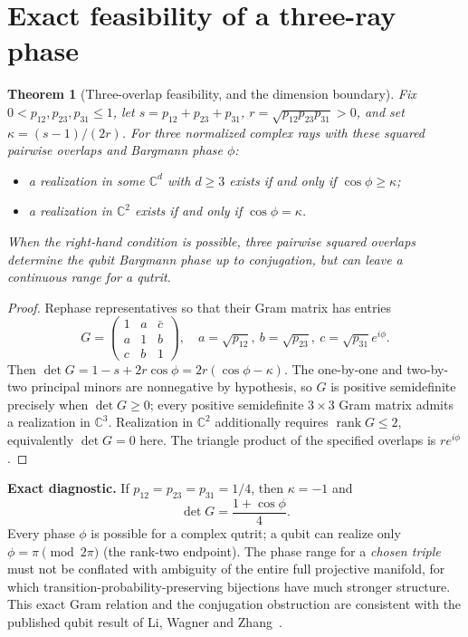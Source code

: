 \documentclass[10pt,letterpaper]{article}
\newtheorem{theorem}{Theorem}
\newcommand{\C}{\mathbb C}
\begin{document}
\section{Exact feasibility of a three-ray phase}
\begin{theorem}[Three-overlap feasibility, and the dimension boundary]\label{thm:gram}
Fix $0<p_{12},p_{23},p_{31}\le1$, let $s=p_{12}+p_{23}+p_{31}$, $r=\sqrt{p_{12}p_{23}p_{31}}>0$, and set $\kappa=(s-1)/(2r)$.  For three normalized complex rays with these squared pairwise overlaps and Bargmann phase $\phi$:
\begin{itemize}[nosep,leftmargin=1.6em]
\item a realization in some $\C^d$ with $d\ge3$ exists \emph{if and only if} $\cos\phi\ge\kappa$;
\item a realization in $\C^2$ exists \emph{if and only if} $\cos\phi=\kappa$.
\end{itemize}
When the right-hand condition is possible, three pairwise squared overlaps determine the qubit Bargmann phase \emph{up to conjugation}, but can leave a continuous range for a qutrit.
\end{theorem}
\begin{proof}
Rephase representatives so that their Gram matrix has entries
\[
G=\begin{pmatrix}1&a&\bar c\\a&1&b\\c&b&1\end{pmatrix},\quad
 a=\sqrt{p_{12}},\ b=\sqrt{p_{23}},\ c=\sqrt{p_{31}}e^{i\phi}.
\]
Then $\det G=1-s+2r\cos\phi=2r(\cos\phi-\kappa)$.  The one-by-one and two-by-two principal minors are nonnegative by hypothesis, so $G$ is positive semidefinite precisely when $\det G\ge0$; every positive semidefinite $3\times3$ Gram matrix admits a realization in $\C^3$.  Realization in $\C^2$ additionally requires $\operatorname{rank}G\le2$, equivalently $\det G=0$ here.  The triangle product of the specified overlaps is $r e^{i\phi}$.
\end{proof}

\textbf{Exact diagnostic.} If $p_{12}=p_{23}=p_{31}=1/4$, then $\kappa=-1$ and
\[
\det G=\frac{1+\cos\phi}{4}.
\]
Every phase $\phi$ is possible for a complex qutrit; a qubit can realize only $\phi=\pi\pmod{2\pi}$ (the rank-two endpoint).  The phase range for a \emph{chosen triple} must not be conflated with ambiguity of the entire full projective manifold, for which transition-probability-preserving bijections have much stronger structure.  This exact Gram relation and the conjugation obstruction are consistent with the published qubit result of Li, Wagner and Zhang~\cite{Li2026}.
\end{document}
